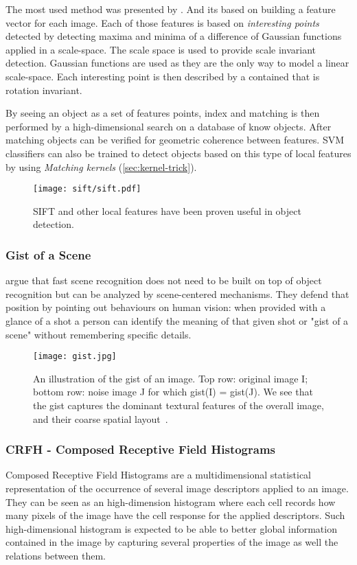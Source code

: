 The most used method was presented by \cite{lowe1999object}. And its based on building a feature vector for each image. Each of those features is based on \emph{interesting points} detected by detecting maxima and minima of a difference of Gaussian functions applied in a scale-space.
The scale space is used to provide scale invariant detection. Gaussian functions are used as they are the only way to model a linear scale-space.
Each interesting point is then described by a contained that is rotation invariant.

By seeing an object as a set of features points, index and matching is then performed by a high-dimensional search on a database of know objects. After matching objects can be verified for geometric coherence between features.
\Gls{SVM} classifiers can also be trained to detect objects based on this type of local features by using \emph{Matching kernels} (\autoref{sec:kernel-trick}).

\begin{figure}[h]
    \texttt{[image: sift/sift.pdf]}
    \caption{{SIFT} and other local features have been proven useful in object detection.}
\end{figure}


\subsubsection{Gist of a Scene}
\label{sec:gist}
\cite{oliva2006building} argue that fast scene recognition does not need to be built on top of object recognition but can be analyzed by scene-centered mechanisms.
They defend that position by pointing out behaviours on human vision:
when provided with a glance of a shot a person can identify the meaning of that given shot or "gist of a scene" without remembering specific details.

\begin{figure}[h]
\center
\texttt{[image: gist.jpg]}
\caption{An illustration of the gist of an image. Top row: original image I; bottom row:
noise image J for which gist(I) = gist(J). We see that the gist captures the dominant
textural features of the overall image, and their coarse spatial layout~\citep{murphy2006object}.}
\end{figure}


\subsubsection{{CRFH} - Composed Receptive Field Histograms}
\label{sec:crfh}\label{sec:global-features}
Composed Receptive Field Histograms are a multidimensional statistical representation of the occurrence of several image descriptors applied to an image.
They can be seen as an high-dimension histogram where each cell records how many pixels of the image have the cell response for the applied descriptors.
Such high-dimensional histogram is expected to be able to better global information contained in the image by capturing several properties of the image as well the relations between them.


